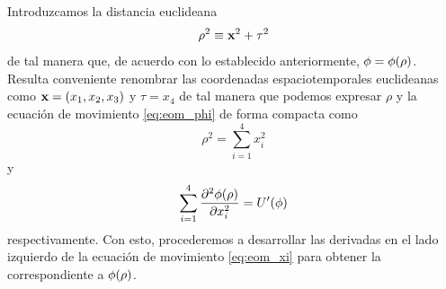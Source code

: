 Introduzcamos la distancia euclideana
\begin{equation}
	\rho^2 \equiv \vb{x}^2 + \tau^2
\end{equation}
de tal manera que, de acuerdo con lo establecido anteriormente,  $\phi = \phi\qty(\rho)$. 
%
Resulta conveniente renombrar las coordenadas espaciotemporales euclideanas como $\vb{x} = \qty(x_1, x_2, x_3)$ y $\tau = x_4$ de tal manera que podemos expresar $\rho$ y la ecuación de movimiento \eqref{eq:eom_phi} de forma compacta como
\begin{equation} \label{eq:rho_xi}
	\rho^2 = \sum_{i = 1}^{4} x_i^2
\end{equation}
y 
\begin{equation} \label{eq:eom_xi}
\sum_{i = 1}^{4} \pdv[2]{\phi\qty(\rho)}{x_i} = U'\qty(\phi)
\end{equation}
respectivamente. 
Con esto, procederemos a desarrollar las derivadas 
en el lado izquierdo de la ecuación de movimiento \eqref{eq:eom_xi} para obtener  
la correspondiente a $\phi\qty(\rho)$. 

